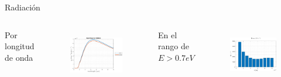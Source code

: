 \documentclass[spanish,a4paper]{beamer}%
\newcommand{\resRadPath}{\graphicspath{{./figuras/Resultados/radiacion/}}}
\begin{document}
		\begin{frame}{Radiación}
			\resRadPath
			\begin{columns}
						\begin{block}{\centering Por longitud de onda}
						\end{block}
					\vspace{15pt}
						\begin{figure}[h]%
								\centering
										\includegraphics[width=\columnwidth]{SiSi_vs_SiGe}
								\label{fig:SiSivsSiGe_rad}%
						\end{figure}
						\vfill
					\vspace{-10pt}
						\begin{block}{\centering En el rango de $E>0.7eV$}
							\end{block}
					\vspace{10pt}
						\begin{figure}[h]%
								\centering
										\includegraphics[width=\columnwidth]{p_Eg_SiGe}%
								\label{fig:SiSiO2Ge_radInt}%
						\end{figure}
						\vfill
				\end{columns}
		\end{frame}
\end{document}
